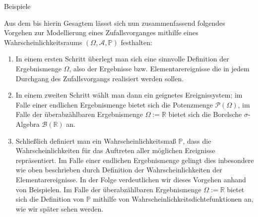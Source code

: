 \documentclass[
  8pt,
  ignorenonframetext,
]{beamer}
\begin{document}
\begin{frame}{Beispiele}
\protect\hypertarget{beispiele}{}
\small
\justifying

Aus dem bis hierin Gesagtem lässst sich nun zusammenfassend folgendes
Vorgehen zur Modellierung eines Zufallsvorganges mithilfe eines
Wahrscheinlichkeitsraums \((\Omega, \mathcal{A}, \mathbb{P})\)
festhalten:

\begin{enumerate}
[(1)]
\item
  In einem ersten Schritt überlegt man sich eine sinnvolle Definition
  der Ergebnismenge \(\Omega\), also der Ergebnisse bzw.
  Elementarereignisse die in jedem Durchgang des Zufallsvorgangs
  realisiert werden sollen.
\item
  In einem zweiten Schritt wählt man dann ein geignetes Ereignissystem;
  im Falle einer endlichen Ergebnismenge bietet sich die Potenzmenge
  \(\mathcal{P}(\Omega)\), im Falle der überabzählbaren Ergebnismenge
  \(\Omega := \mathbb{R}\) bietet sich die Borelsche \(\sigma\)-Algebra
  \(\mathcal{B}(\mathbb{R})\) an.
\item
  Schließlich definiert man ein Wahrscheinlichkeitsmaß \(\mathbb{P}\),
  dass die Wahrscheinlichkeiten für das Auftreten aller möglichen
  Ereignisse repräsentiert. Im Falle einer endlichen Ergebnismenge
  gelingt dies inbesondere wie oben beschrieben durch Definition der
  Wahrscheinlichkeiten der Elementarereignisse. In der Folge
  verdeutlichen wir dieses Vorgehen anhand von Beispielen. Im Falle der
  überabzählbaren Ergebnismenge \(\Omega := \mathbb{R}\) bietet sich die
  Definition von \(\mathbb{P}\) mithilfe von
  Wahrscheinlichkeitsdichtefunktionen an, wie wir später sehen werden.
\end{enumerate}
\end{frame}
\end{document}

